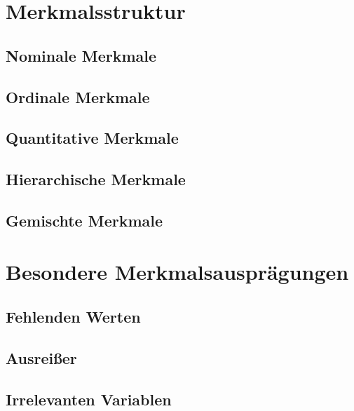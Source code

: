 \section{Merkmalsstruktur}
\subsection{Nominale Merkmale}
\subsection{Ordinale Merkmale}
\subsection{Quantitative Merkmale}
\subsection{Hierarchische Merkmale}
\subsection{Gemischte Merkmale}

\section{Besondere Merkmalsausprägungen}
\subsection{Fehlenden Werten}
\subsection{Ausreißer}
\subsection{Irrelevanten Variablen}

